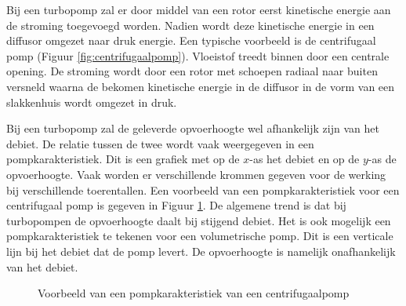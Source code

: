 Bij een turbopomp zal er door middel van een rotor eerst kinetische energie aan de stroming toegevoegd worden. Nadien wordt deze kinetische energie in een diffusor omgezet naar druk energie. Een typische voorbeeld is de centrifugaal pomp (Figuur \ref{fig:centrifugaalpomp}). Vloeistof treedt binnen door een centrale opening. De stroming wordt door een rotor met schoepen radiaal naar buiten versneld waarna de bekomen kinetische energie in de diffusor in de vorm van een slakkenhuis wordt omgezet in druk.

Bij een turbopomp zal de geleverde opvoerhoogte wel afhankelijk zijn van het debiet. De relatie tussen de twee wordt vaak weergegeven in een pompkarakteristiek. Dit is een grafiek met op de $x$-as het debiet en op de $y$-as de opvoerhoogte. Vaak worden er verschillende krommen gegeven voor de werking bij verschillende toerentallen. Een voorbeeld van een pompkarakteristiek voor een centrifugaal pomp is gegeven in Figuur \ref{fig:Pompkarakteristiek}. De algemene trend is dat bij turbopompen de opvoerhoogte daalt bij stijgend debiet. Het is ook mogelijk een pompkarakteristiek te tekenen voor een volumetrische pomp. Dit is een verticale lijn bij het debiet dat de pomp levert. De opvoerhoogte is namelijk onafhankelijk van het debiet.
\begin{figure}
	\centering
	
	\caption{Voorbeeld van een pompkarakteristiek van een centrifugaalpomp}
	\label{fig:Pompkarakteristiek}
\end{figure}

